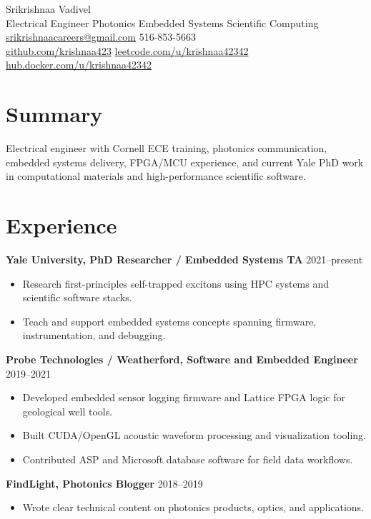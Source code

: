 \documentclass[10pt]{article}
\begin{document}
\begin{center}
{\LARGE Srikrishnaa Vadivel}\\
Electrical Engineer \textbar{} Photonics \textbar{} Embedded Systems \textbar{} Scientific Computing\\
\href{mailto:srikrishnaacareers@gmail.com}{srikrishnaacareers@gmail.com} \textbar{} 516-853-5663\\
\href{https://github.com/krishnaa423}{github.com/krishnaa423} \textbar{}
\href{https://leetcode.com/u/krishnaa42342/}{leetcode.com/u/krishnaa42342} \textbar{}
\href{https://hub.docker.com/u/krishnaa42342}{hub.docker.com/u/krishnaa42342}
\end{center}
\section{Summary}
Electrical engineer with Cornell ECE training, photonics communication,
embedded systems delivery, FPGA/MCU experience, and current Yale PhD work in
computational materials and high-performance scientific software.
\section{Experience}
\textbf{Yale University, PhD Researcher / Embedded Systems TA} \hfill 2021--present
\begin{itemize}
\item Research first-principles self-trapped excitons using HPC systems and
scientific software stacks.
\item Teach and support embedded systems concepts spanning firmware,
instrumentation, and debugging.
\end{itemize}
\textbf{Probe Technologies / Weatherford, Software and Embedded Engineer} \hfill 2019--2021
\begin{itemize}
\item Developed embedded sensor logging firmware and Lattice FPGA logic for
geological well tools.
\item Built CUDA/OpenGL acoustic waveform processing and visualization tooling.
\item Contributed ASP and Microsoft database software for field data workflows.
\end{itemize}
\textbf{FindLight, Photonics Blogger} \hfill 2018--2019
\begin{itemize}
\item Wrote clear technical content on photonics products, optics, and
applications.
\end{itemize}
\end{document}
